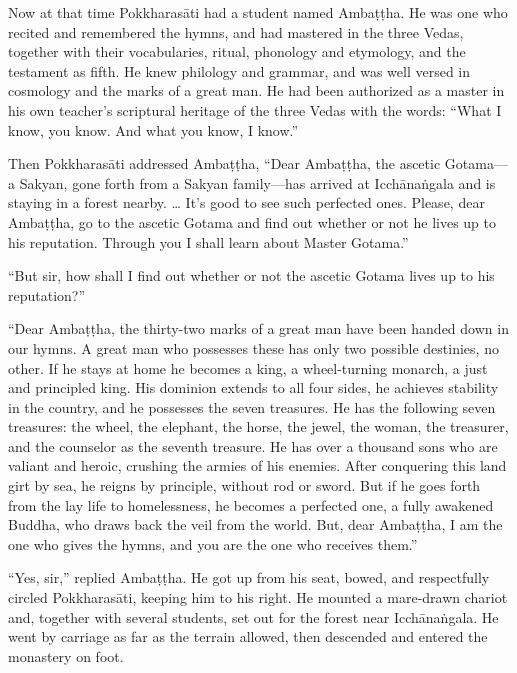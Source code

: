 \documentclass[12pt,openany]{book}%
\begin{document}
Now at that time \textsanskrit{Pokkharasāti} had a student named \textsanskrit{Ambaṭṭha}. He was one who recited and remembered the hymns, and had mastered in the three Vedas, together with their vocabularies, ritual, phonology and etymology, and the testament as fifth. He knew philology and grammar, and was well versed in cosmology and the marks of a great man. He had been authorized as a master in his own teacher’s scriptural heritage of the three Vedas with the words: “What I know, you know. And what you know, I know.” 

Then \textsanskrit{Pokkharasāti} addressed \textsanskrit{Ambaṭṭha}, “Dear \textsanskrit{Ambaṭṭha}, the ascetic Gotama—a Sakyan, gone forth from a Sakyan family—has arrived at \textsanskrit{Icchānaṅgala} and is staying in a forest nearby. … It’s good to see such perfected ones. Please, dear \textsanskrit{Ambaṭṭha}, go to the ascetic Gotama and find out whether or not he lives up to his reputation. Through you I shall learn about Master Gotama.” 

“But sir, how shall I find out whether or not the ascetic Gotama lives up to his reputation?” 

“Dear \textsanskrit{Ambaṭṭha}, the thirty-two marks of a great man have been handed down in our hymns. A great man who possesses these has only two possible destinies, no other. If he stays at home he becomes a king, a wheel-turning monarch, a just and principled king. His dominion extends to all four sides, he achieves stability in the country, and he possesses the seven treasures. He has the following seven treasures: the wheel, the elephant, the horse, the jewel, the woman, the treasurer, and the counselor as the seventh treasure. He has over a thousand sons who are valiant and heroic, crushing the armies of his enemies. After conquering this land girt by sea, he reigns by principle, without rod or sword. But if he goes forth from the lay life to homelessness, he becomes a perfected one, a fully awakened Buddha, who draws back the veil from the world. But, dear \textsanskrit{Ambaṭṭha}, I am the one who gives the hymns, and you are the one who receives them.” 

“Yes, sir,” replied \textsanskrit{Ambaṭṭha}. He got up from his seat, bowed, and respectfully circled \textsanskrit{Pokkharasāti}, keeping him to his right. He mounted a mare-drawn chariot and, together with several students, set out for the forest near \textsanskrit{Icchānaṅgala}. He went by carriage as far as the terrain allowed, then descended and entered the monastery on foot. 
\end{document}
